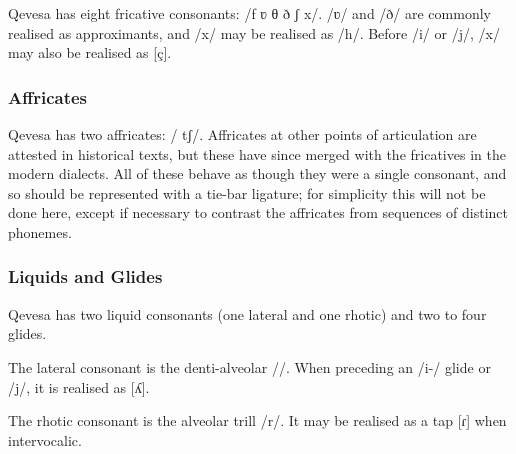 \documentclass[grammar]{subfiles}
\begin{document}
  Qevesa has eight fricative consonants: /f ʋ θ ð  ʃ x/.  /ʋ/ and /ð/ are commonly realised as approximants, and /x/ may be realised as /h/. Before /i/ or /j/, /x/ may also be realised as [ç].
% 

  \subsubsection{Affricates}
  \label{sssec:affricates}

  Qevesa has two affricates: / tʃ/.  Affricates at other points of articulation are attested in historical texts, but these have since merged with the fricatives in the modern dialects.  All of these behave as though they were a single consonant, and so should be represented with a tie-bar ligature; for simplicity this will not be done here, except if necessary to contrast the affricates from sequences of distinct phonemes. 


  \subsubsection{Liquids and Glides}
  \label{sssec:liquids}

  Qevesa has two liquid consonants (one lateral and one rhotic) and two to four glides.

  The lateral consonant is the denti-alveolar //. When preceding an /i-/ glide or /j/, it is realised as [ʎ].  %

  The rhotic consonant is the alveolar trill /r/.  It may be realised as a tap [ɾ] when intervocalic.  
\end{document}
